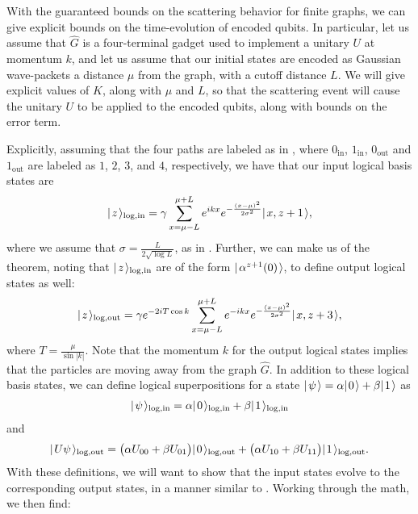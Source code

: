 \documentclass[../thesis-main/thesis-main]{subfiles}
\begin{document}
With the guaranteed bounds on the scattering behavior for finite graphs, we can give explicit bounds on the time-evolution of encoded qubits.  In particular, let us assume that $\widehat{G}$ is a four-terminal gadget used to implement a unitary $U$ at momentum $k$, and let us assume that our initial states are encoded as Gaussian wave-packets a distance $\mu$ from the graph, with a cutoff distance $L$.  We will give explicit values of $K$, along with $\mu$ and $L$, so that the scattering event will cause the unitary $U$ to be applied to the encoded qubits, along with bounds on the error term.


Explicitly, assuming that the four paths are labeled as in , where $0_\text{in}$, $1_{\text{in}}$, $0_{\text{out}}$ and $1_{\text{out}}$ are labeled as $1$, $2$, $3$, and $4$, respectively, we have that our input logical basis states are
\begin{align}
  |\mspace{2mu} z \mspace{2mu} \rangle_{\text{log},\text{in}} = \gamma \sum_{x = \mu - L}^{\mu + L} e^{ i k x} e^{ - \frac{(x-\mu)^2}{2\sigma^2}} |\mspace{2mu} x,z+1 \mspace{2mu} \rangle,
  \label{eq:single_qubit_input_encoding}
\end{align}
where we assume that $\sigma = \frac{L}{2\sqrt{\log L}}$, as in .  Further, we can make us of the theorem, noting that $|\mspace{2mu} z \mspace{2mu} \rangle_{\text{log},\text{in}}$ are of the form $|\mspace{2mu} \alpha^{z+1}(0) \mspace{2mu} \rangle$, to define output logical states as well:
 \begin{align}
  |\mspace{2mu} z \mspace{2mu} \rangle_{\text{log},\text{out}} = \gamma e^{- 2 i T \cos k} \sum_{x = \mu - L}^{\mu + L} e^{ -i k x} e^{ - \frac{(x-\mu)^2}{2\sigma^2}} |\mspace{2mu} x,z+3 \mspace{2mu} \rangle,
  \label{eq:single_qubit_output_encoding}
\end{align}
where $T = \frac{\mu}{\sin |k|}$.  Note that the momentum $k$ for the output logical states implies that the particles are moving away from the graph $\widehat{G}$.  In addition to these logical basis states, we can define logical superpositions for a state $|\mspace{2mu} \psi \mspace{2mu} \rangle = \alpha |\mspace{2mu} 0 \mspace{2mu} \rangle + \beta|\mspace{2mu} 1 \mspace{2mu} \rangle$ as
\begin{align}
  |\mspace{2mu} \psi \mspace{2mu} \rangle_{\text{log},\text{in}} = \alpha |\mspace{2mu} 0 \mspace{2mu} \rangle_{\text{log},\text{in}} + \beta |\mspace{2mu} 1 \mspace{2mu} \rangle_{\text{log},\text{in}}
\end{align} 
and
\begin{align}
  |\mspace{2mu} U \psi \mspace{2mu} \rangle_{\text{log},\text{out}} = \big(\alpha U_{00} + \beta U_{01} \big) |\mspace{2mu} 0 \mspace{2mu} \rangle_{\text{log},\text{out}} + \big(\alpha U_{10} + \beta U_{11} \big)|\mspace{2mu} 1 \mspace{2mu} \rangle_{\text{log},\text{out}}.
\end{align}
With these definitions, we will want to show that the input states evolve to the corresponding output states, in a manner similar to .  Working through the math, we then find:
\end{document}
